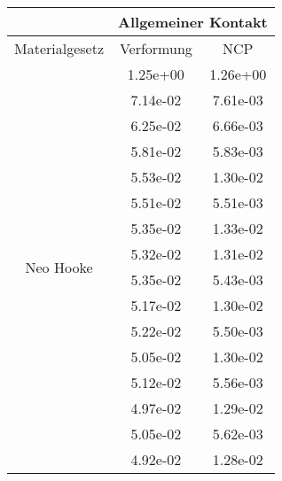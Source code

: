 \begin{table} 
\centering 
\begin{tabular}{c|cc|} 
\cline{2-3} 
 & \multicolumn{2}{|c|}{Allgemeiner Kontakt} \\ 
\hline 
\multicolumn{1}{|c|}{Materialgesetz} & \multicolumn{1}{c|}{Verformung} & \multicolumn{1}{c|}{NCP} \\ 
\hline 
\multicolumn{1}{|c|}{\multirow{101}{*}{Neo Hooke}} &\multicolumn{1}{|c|}{  1.25e+00} & \multicolumn{1}{|c|}{  1.26e+00} \\ 
\multicolumn{1}{|c|}{} & \multicolumn{1}{|c|}{  7.14e-02} & \multicolumn{1}{|c|}{  7.61e-03} \\ 
\multicolumn{1}{|c|}{} & \multicolumn{1}{|c|}{  6.25e-02} & \multicolumn{1}{|c|}{  6.66e-03} \\ 
\multicolumn{1}{|c|}{} & \multicolumn{1}{|c|}{  5.81e-02} & \multicolumn{1}{|c|}{  5.83e-03} \\ 
\multicolumn{1}{|c|}{} & \multicolumn{1}{|c|}{  5.53e-02} & \multicolumn{1}{|c|}{  1.30e-02} \\ 
\multicolumn{1}{|c|}{} & \multicolumn{1}{|c|}{  5.51e-02} & \multicolumn{1}{|c|}{  5.51e-03} \\ 
\multicolumn{1}{|c|}{} & \multicolumn{1}{|c|}{  5.35e-02} & \multicolumn{1}{|c|}{  1.33e-02} \\ 
\multicolumn{1}{|c|}{} & \multicolumn{1}{|c|}{  5.32e-02} & \multicolumn{1}{|c|}{  1.31e-02} \\ 
\multicolumn{1}{|c|}{} & \multicolumn{1}{|c|}{  5.35e-02} & \multicolumn{1}{|c|}{  5.43e-03} \\ 
\multicolumn{1}{|c|}{} & \multicolumn{1}{|c|}{  5.17e-02} & \multicolumn{1}{|c|}{  1.30e-02} \\ 
\multicolumn{1}{|c|}{} & \multicolumn{1}{|c|}{  5.22e-02} & \multicolumn{1}{|c|}{  5.50e-03} \\ 
\multicolumn{1}{|c|}{} & \multicolumn{1}{|c|}{  5.05e-02} & \multicolumn{1}{|c|}{  1.30e-02} \\ 
\multicolumn{1}{|c|}{} & \multicolumn{1}{|c|}{  5.12e-02} & \multicolumn{1}{|c|}{  5.56e-03} \\ 
\multicolumn{1}{|c|}{} & \multicolumn{1}{|c|}{  4.97e-02} & \multicolumn{1}{|c|}{  1.29e-02} \\ 
\multicolumn{1}{|c|}{} & \multicolumn{1}{|c|}{  5.05e-02} & \multicolumn{1}{|c|}{  5.62e-03} \\ 
\multicolumn{1}{|c|}{} & \multicolumn{1}{|c|}{  4.92e-02} & \multicolumn{1}{|c|}{  1.28e-02} \\ 

\end{tabular}
\end{table}
